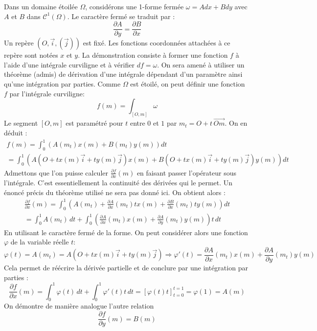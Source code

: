 \begin{demo}
 Dans un domaine étoilée $\Omega$, considérons une 1-forme fermée $\omega = Adx+Bdy$ avec $A$ et $B$ dans $\mathcal C^1(\Omega)$. Le caractère fermé se traduit par :
\begin{displaymath}
 \frac{\partial A}{\partial y}= \frac{\partial B}{\partial x}
\end{displaymath}
Un repère $(O,\overrightarrow i ,(\overrightarrow j))$ est fixé. Les fonctions coordonnées attachées à ce repère sont notées $x$ et $y$.\newline
La démonstration consiste à former une fonction $f$ à l'aide d'une intégrale curviligne et à vérifier $df=\omega$. On sera amené à utiliser un théorème (admis) de dérivation d'une intégrale dépendant d'un paramètre ainsi qu'une intégration par parties.\newline
Comme $\Omega$ est étoilé, on peut définir une fonction $f$ par l'intégrale curviligne:
\begin{displaymath}
 f(m)=\int_{[O,m]}\omega
\end{displaymath}
Le segment $[O,m]$ est paramétré pour $t$ entre $0$ et $1$ par $m_t=O+t\,\overrightarrow{Om}$. On en déduit :
\begin{multline*}
 f(m) = \int_0^1\left(A(m_t)x(m)+B(m_t)y(m) \right) dt \\ =
\int_0^1\left(
A\left(O+tx(m)\overrightarrow i +ty(m)\overrightarrow j\right)x(m)
+
B\left(O+tx(m)\overrightarrow i +ty(m)\overrightarrow j\right)y(m) \right) dt
\end{multline*}
Admettons que l'on puisse calculer $\frac{\partial f}{\partial x}(m)$ en faisant passer l'opérateur sous l'intégrale. C'est essentiellement la continuité des dérivées qui le permet. Un énoncé précis du théorème utilisé ne sera pas donné ici. On obtient alors :
\begin{multline*}
 \frac{\partial f}{\partial x}(m) 
= \int_0^1\left(
A(m_t)+ \frac{\partial A}{\partial x}(m_t)tx(m) + \frac{\partial B}{\partial x}(m_t)ty(m)
\right) dt \\
= \int_0^1 A(m_t) \, dt +
\int_0^1\left(
\frac{\partial A}{\partial x}(m_t)x(m) + \frac{\partial A}{\partial y}(m_t)y(m)
\right)t\, dt
\end{multline*}
En utilisant le caractère fermé de la forme. On peut considérer alors une fonction $\varphi$ de la variable réelle $t$:
\begin{displaymath}
 \varphi(t)=A(m_t)=A\left(O+tx(m)\overrightarrow i +ty(m)\overrightarrow j \right)
\Rightarrow
\varphi'(t)= \frac{\partial A}{\partial x}(m_t)x(m) + \frac{\partial A}{\partial y}(m_t)y(m)
\end{displaymath}
Cela permet de réécrire la dérivée partielle et de conclure par une intégration par parties :
\begin{displaymath}
 \frac{\partial f}{\partial x}(m) 
= \int_0^1 \varphi(t)\,dt + \int_0^1 \varphi'(t)t\,dt
= \left[ \varphi(t)t\right]_{t=0}^{t=1}
= \varphi(1)=A(m) 
\end{displaymath}
On démontre de manière analogue l'autre relation
\begin{displaymath}
 \frac{\partial f}{\partial y}(m)=B(m) 
\end{displaymath}
\end{demo}

